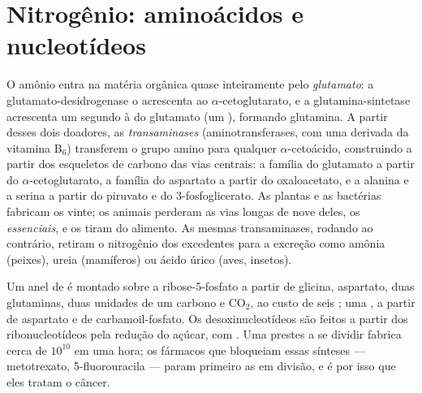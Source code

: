 \section{Nitrogênio: aminoácidos e nucleotídeos}

\begin{definition}\label{def:b1:biosyntheses-integration:nitrogen}
O amônio entra na matéria orgânica quase inteiramente pelo
\emph{glutamato}: a glutamato-desidrogenase o acrescenta ao
$\alpha$-cetoglutarato, e a glutamina-sintetase acrescenta um segundo à
 do glutamato (um ), formando glutamina. A partir
desses dois doadores, as \emph{transaminases} (aminotransferases, com
uma  derivada da vitamina B$_6$) transferem o grupo amino para
qualquer $\alpha$-cetoácido, construindo  a partir dos
esqueletos de carbono das vias centrais: a família do glutamato a partir
do $\alpha$-cetoglutarato, a família do aspartato a partir do
oxaloacetato, e a alanina e a serina a partir do piruvato e do
3-fosfoglicerato. As plantas e as bactérias fabricam os vinte; os
animais perderam as vias longas de nove deles, os 
\emph{essenciais}, e os tiram do alimento. As mesmas transaminases,
rodando ao contrário, retiram o nitrogênio dos  excedentes
para a excreção como amônia (peixes), ureia (mamíferos) ou ácido úrico
(aves, insetos).
\end{definition}

\begin{example}[Nucleotídeos]\label{ex:b1:biosyntheses-integration:nucleotides}
Um anel de  é montado sobre a ribose-5-fosfato a partir de
glicina, aspartato, duas glutaminas, duas unidades de um carbono e
$\mathrm{CO_2}$, ao custo de seis ; uma , a partir de
aspartato e de carbamoil-fosfato. Os desoxinucleotídeos são feitos a
partir dos ribonucleotídeos pela redução do açúcar, com . Uma
 prestes a se dividir fabrica cerca de $10^{10}$  em
uma hora; os fármacos que bloqueiam essas sínteses --- metotrexato,
5-fluorouracila --- param primeiro as  em divisão, e é por isso
que eles tratam o câncer.
\end{example}


